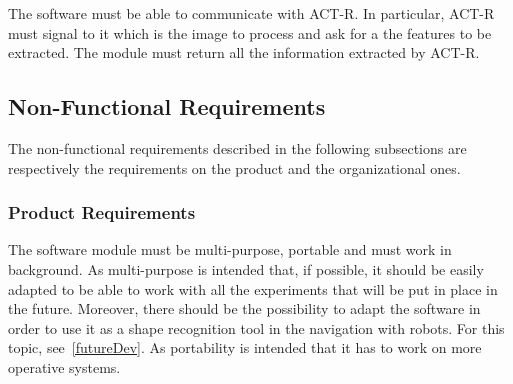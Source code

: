 		The software must be able to communicate with ACT-R. 
		In particular, ACT-R must signal to it which is the image to process and ask for a the features to be extracted. The module must return all the information extracted by ACT-R.

		\subsection{Non-Functional Requirements}
		The non-functional requirements described in the following subsections are respectively the requirements on the product and the organizational ones.

			\subsubsection{Product Requirements}
			The software module must be multi-purpose, portable and must work in background.
			As multi-purpose is intended that, if possible, it should be easily adapted to be able to work with all the experiments that will be put in place in the future. Moreover, there should be the possibility to adapt the software in order to use it as a shape recognition tool in the navigation with robots. For this topic, see~\ref{futureDev}. 
			As portability is intended that it has to work on more operative systems.
	
